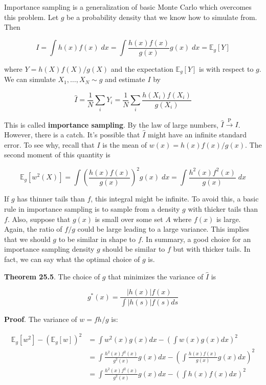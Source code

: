 Importance sampling is a generalization of basic Monte Carlo which
overcomes this problem. Let \(g\) be a probability density that we know
how to simulate from. Then

\[ I = \int h(x) f(x) \; dx = \int \frac{h(x) f(x)}{g(x)} g(x) \; dx  = \mathbb{E}_g[Y] \]

where \(Y = h(X) f(X) / g(X)\) and the expectation \(\mathbb{E}_g[Y]\)
is with respect to \(g\). We can simulate \(X_1, \dots, X_N \sim g\) and
estimate \(I\) by

\[ \hat{I} = \frac{1}{N} \sum_i Y_i = \frac{1}{N} \sum_i \frac{h(X_i) f(X_i)}{g(X_i)} \]

This is called \textbf{importance sampling}. By the law of large
numbers, \(\hat{I} \xrightarrow{\text{P}} I\). However, there is a
catch. It's possible that \(\hat{I}\) might have an infinite standard
error. To see why, recall that \(I\) is the mean of
\(w(x) = h(x) f(x) / g(x)\). The second moment of this quantity is

\[ \mathbb{E}_g[w^2(X)] = \int \left( \frac{h(x) f(x)}{g(x)} \right)^2 g(x) \; dx = \int \frac{h^2(x) f^2(x)}{g(x)} \; dx\]

If \(g\) has thinner tails than \(f\), this integral might be infinite.
To avoid this, a basic rule in importance sampling is to sample from a
density \(g\) with thicker tails than \(f\). Also, suppose that \(g(x)\)
is small over some set \(A\) where \(f(x)\) is large. Again, the ratio
of \(f / g\) could be large leading to a large variance. This implies
that we should \(g\) to be similar in shape to \(f\). In summary, a good
choice for an importance sampling density \(g\) should be similar to
\(f\) but with thicker tails. In fact, we can say what the optimal
choice of \(g\) is.

\textbf{Theorem 25.5}. The choice of \(g\) that minimizes the variance
of \(\hat{I}\) is

\[ g^*(x) = \frac{|h(x)| f(x) }{\int | h(s) | f(s)  ds} \]

\textbf{Proof}. The variance of \(w = f h / g\) is:

\[
\begin{align}
\mathbb{E}_g[w^2] - (\mathbb{E}_g[w])^2 &= \int w^2(x) g(x) dx - \left( \int w(x) g(x) dx \right)^2 \\
&= \int \frac{h^2(x) f^2(x)}{g^2(x)} g(x) dx - \left( \int \frac{h(x) f(x)}{g(x)} g(x) dx \right)^2 \\
&= \int \frac{h^2(x) f^2(x)}{g^2(x)} g(x) dx - \left( \int h(x) f(x) dx \right)^2
\end{align}
\]

